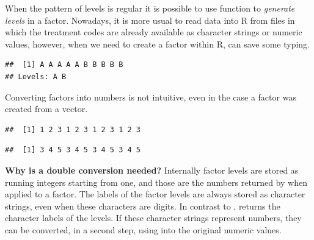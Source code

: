 \documentclass[krantz2]{krantz}\usepackage{knitr}%
\begin{document}
\begin{explainbox}
When the pattern of levels is regular it is possible to use function  to \emph{generate levels} in a factor. Nowadays, it is more usual to read data into R from files in which the treatment codes are already available as character strings or numeric values, however, when we need to create a factor within R,  can save some typing.

\begin{knitrout}\footnotesize
{}\color{fgcolor}\begin{kframe}
\begin{alltt}
\hlstd{(}\hlstd{,} \hlstd{,}  \hlstd{=} \hlstd{(}\hlstd{,} \hlstd{))}
\end{alltt}
\begin{verbatim}
##  [1] A A A A A B B B B B
## Levels: A B
\end{verbatim}
\end{kframe}
\end{knitrout}
\end{explainbox}

Converting factors into numbers is not intuitive, even in the case a factor was created from a  vector.

\begin{knitrout}\footnotesize
{}\color{fgcolor}\begin{kframe}
\begin{alltt}
 \hlkwb{<-} \hlstd{(}\hlopt{:}\hlstd{,} \hlstd{)}
 \hlkwb{<-} 
\end{alltt}
\begin{verbatim}
##  [1] 1 2 3 1 2 3 1 2 3 1 2 3
\end{verbatim}
\begin{alltt}
\hlstd{(}
\end{alltt}
\begin{verbatim}
##  [1] 3 4 5 3 4 5 3 4 5 3 4 5
\end{verbatim}
\end{kframe}
\end{knitrout}

\begin{explainbox}
\textbf{Why is a double conversion needed?} Internally factor levels are stored as running integers starting from one, and those are the numbers returned by  when applied to a factor. The labels of the factor levels are always stored as character strings, even when these characters are digits. In contrast to ,  returns the character labels of the levels. If these character strings represent numbers, they can be converted, in a second step, using  into the original numeric values.
\end{explainbox}
\end{document}
